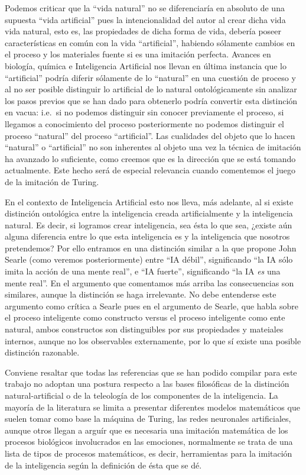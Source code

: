 \documentclass[12pt]{memoir}
\begin{document}
Podemos criticar que la ``vida natural'' no se diferenciaría en absoluto de una supuesta ``vida artificial'' pues la intencionalidad del autor al crear dicha vida vida natural, esto es, las propiedades de dicha forma de vida, debería poseer características en común con la vida ``artificial'', habiendo sólamente cambios en el proceso y los materiales fuente si es una imitación perfecta. Avances en biología, química e Inteligencia Artificial nos llevan en última instancia que lo ``artificial'' podría diferir sólamente de lo ``natural'' en una cuestión de proceso y al no ser posible distinguir lo artificial de lo natural ontológicamente sin analizar los pasos previos que se han dado para obtenerlo podría convertir esta distinción en vacua: i.e.\ si no podemos distinguir sin conocer previamente el proceso, si llegamos a conocimiento del proceso posteriormente no podemos distinguir el proceso ``natural'' del proceso ``artificial''. Las cualidades del objeto que lo hacen ``natural'' o ``artificial'' no son inherentes al objeto una vez la técnica de imitación ha avanzado lo suficiente, como creemos que es la dirección que se está tomando actualmente. Este hecho será de especial relevancia cuando comentemos el juego de la imitación de Turing.

En el contexto de Inteligencia Artificial esto nos lleva, más adelante, al si existe distinción ontológica entre la inteligencia creada artificialmente y la inteligencia natural. Es decir, si logramos crear inteligencia, sea ésta lo que sea, ¿existe aún alguna diferencia entre lo que esta inteligencia es y la inteligencia que nosotros pretendemos? Por ello entramos en una distinción similar a la que propone John Searle (como veremos posteriormente) entre ``IA débil'', significando ``la IA sólo imita la acción de una mente real'', e ``IA fuerte'', significando ``la IA \textit{es} una mente real''. En el argumento que comentamos más arriba las consecuencias son similares, aunque la distinción se haga irrelevante. No debe entenderse este argumento como crítica a Searle pues en el argumento de Searle, que habla sobre el proceso inteligente como constructo versus el proceso inteligente como ente natural, ambos constructos son distinguibles por sus propiedades y mateiales internos, aunque no los observables externamente, por lo que sí existe una posible distinción razonable.

Conviene resaltar que todas las referencias que se han podido compilar para este trabajo no adoptan una postura respecto a las bases filosóficas de la distinción natural-artificial o de la teleología de los componentes de la inteligencia. La mayoría de la literatura se limita a presentar diferentes modelos matemáticos que suelen tomar como base la máquina de Turing, las redes neuronales artificiales, aunque otros llegan a arguír que es necesaria una imitación matemática de los procesos biológicos involucrados en las emociones, normalmente se trata de una lista de tipos de procesos matemáticos, es decir, herramientas para la imitación de la inteligencia según la definición de ésta que se dé.
\end{document}
